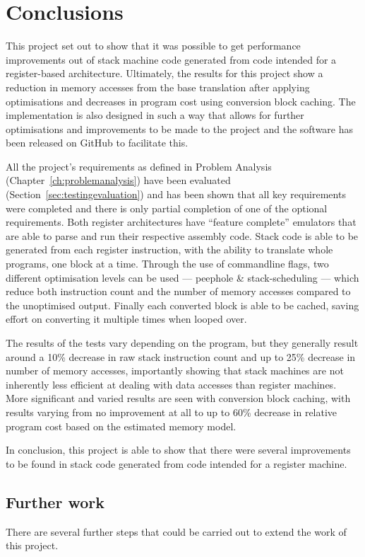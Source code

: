 \chapter{Conclusions}\label{ch:conclusions}

This project set out to show that it was possible to get performance
improvements out of stack machine code generated from code intended for a
register-based architecture. Ultimately, the results for this project show a
reduction in memory accesses from the base translation after applying
optimisations and decreases in program cost using conversion block caching. The
implementation is also designed in such a way that allows for further
optimisations and improvements to be made to the project and the software has
been released on GitHub to facilitate this.

All the project's requirements as defined in Problem Analysis
(Chapter~\ref{ch:problemanalysis}) have been evaluated
(Section~\ref{sec:testingevaluation}) and has been shown that all key
requirements were completed and there is only partial completion of one of the
optional requirements. Both register architectures have ``feature complete''
emulators that are able to parse and run their respective assembly code. Stack
code is able to be generated from each register instruction, with the ability to
translate whole programs, one block at a time. Through the use of commandline
flags, two different optimisation levels can be used --- peephole \&
stack-scheduling --- which reduce both instruction count and the number of
memory accesses compared to the unoptimised output.  Finally each converted
block is able to be cached, saving effort on converting it multiple times when
looped over.

The results of the tests vary depending on the program, but they generally
result around a 10\% decrease in raw stack instruction count and up to 25\%
decrease in number of memory accesses, importantly showing that stack machines
are not inherently less efficient at dealing with data accesses than register
machines. More significant and varied results are seen with conversion block
caching, with results varying from no improvement at all to up to 60\% decrease
in relative program cost based on the estimated memory model.

In conclusion, this project is able to show that there were several
improvements to be found in stack code generated from code intended for a
register machine.

\section{Further work}\label{sec:furtherwork}
There are several further steps that could be carried out to extend the work of
this project.

